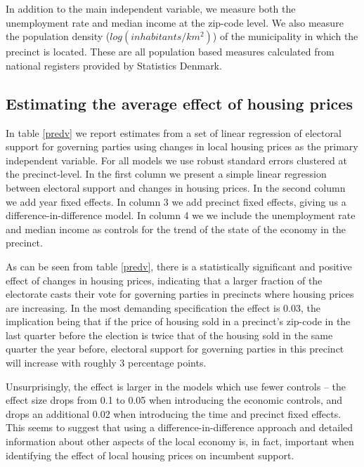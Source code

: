\documentclass[12pt,a4paper]{article}
\begin{document}
In addition to the main independent variable, we measure both the unemployment rate and median income at the zip-code level. We also measure the population density ($log(inhabitants/km^2)$) of the municipality in which the precinct is located. These are all population based measures calculated from national registers provided by Statistics Denmark.


\subsection{Estimating the average effect of housing prices}
In table \ref{predv}  we report estimates from a set of linear regression of electoral support for governing parties using changes in local housing prices as the primary independent variable. For all models we use robust standard errors clustered at the precinct-level. In the first column we present a simple linear regression between electoral support and changes in housing prices. In the second column we add year fixed effects. In column 3 we add precinct fixed effects, giving us a difference-in-difference model. In column 4 we we include the unemployment rate and median income as controls for the trend of the state of the economy in the precinct.




As can be seen from table \ref{predv}, there is a statistically significant and positive effect of changes in housing prices, indicating that a larger fraction of the electorate casts their vote for governing parties in precincts where housing prices are increasing. In the most demanding specification the effect is 0.03, the implication being that if the price of housing sold in a precinct's zip-code in the last quarter before the election is twice that of the housing sold in the same quarter the year before, electoral support for  governing parties in this precinct will increase with roughly 3 percentage points.

Unsurprisingly, the effect is larger in the models which use fewer controls --  the effect size drops from 0.1 to 0.05 when introducing the economic controls, and drops an additional 0.02 when introducing the time and precinct fixed effects. This seems to suggest that using a difference-in-difference approach and detailed information about other aspects of the local economy is, in fact, important when identifying the effect of local housing prices on incumbent support.



\end{document}
